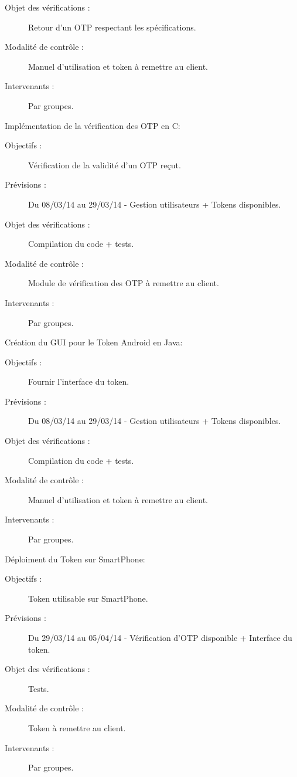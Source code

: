 \documentclass{../../res/univ-projet}
\begin{document}
\begin{description}
\begin{description}
		\item[Objet des vérifications :] Retour d'un OTP respectant les spécifications.
		\item[Modalité de contrôle :] Manuel d'utilisation et token à remettre au client.
		\item[Intervenants :] Par groupes.
	\end{description}
	\vfill
	\item Implémentation de la vérification des OTP en C:
	\begin{description}
		\item[Objectifs :] Vérification de la validité d'un OTP reçut.
		\item[Prévisions :] Du 08/03/14 au 29/03/14 - Gestion utilisateurs + Tokens disponibles.
		\item[Objet des vérifications :] Compilation du code + tests.
		\item[Modalité de contrôle :] Module de vérification des OTP à remettre au client.
		\item[Intervenants :] Par groupes.
	\end{description}
	\vfill
	\item Création du GUI pour le Token Android en Java:
	\begin{description}
		\item[Objectifs :] Fournir l'interface du token.
		\item[Prévisions :] Du 08/03/14 au 29/03/14 - Gestion utilisateurs + Tokens disponibles.
		\item[Objet des vérifications :] Compilation du code + tests.
		\item[Modalité de contrôle :] Manuel d'utilisation et token à remettre au client.
		\item[Intervenants :] Par groupes.
	\end{description}
	\vfill
	\item Déploiment du Token sur SmartPhone:
	\begin{description}
		\item[Objectifs :] Token utilisable sur SmartPhone.
		\item[Prévisions :] Du 29/03/14 au 05/04/14 - Vérification d'OTP disponible + Interface du token.
		\item[Objet des vérifications :] Tests.
		\item[Modalité de contrôle :] Token à remettre au client.
		\item[Intervenants :] Par groupes.
	\end{description}

\end{description}
\end{document}
